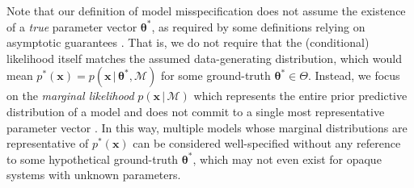 \documentclass[twoside,11pt]{article}
\newcommand{\x}{\boldsymbol{x}}
\newcommand{\thetab}{\boldsymbol{\theta}}
\newcommand{\0}{\boldsymbol{0}}
\newcommand{\given}{\,|\,}
\renewcommand{\cite}[1]{\citep{#1}}
\begin{document}
Note that our definition of model misspecification does not assume the existence of a \textit{true} parameter vector $\thetab^*$, as required by some definitions relying on asymptotic guarantees \cite{vandervaart2000asymptotic}. 
That is, we do not require that the (conditional) likelihood itself matches the assumed data-generating distribution, which would mean $p^*(\x) = p(\x \given \thetab^*, \mathcal{M})$ for some ground-truth $\thetab^*\in\Theta$.
Instead, we focus on the \textit{marginal likelihood} $p(\x \given \mathcal{M})$ which represents the entire prior predictive distribution of a model and does not commit to a single most representative parameter vector \cite{lotfi2022bayesian, masegosa2020learning}.
In this way, multiple models whose marginal distributions are representative of $p^*(\x)$ can be considered well-specified without any reference to some hypothetical ground-truth $\thetab^*$, which may not even exist for opaque systems with unknown parameters.
\end{document}
